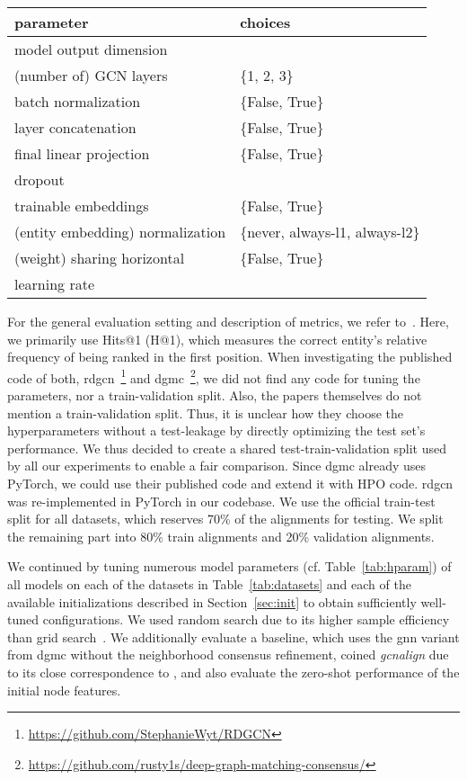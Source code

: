\documentclass[runningheads]{llncs}
\begin{document}
\begin{table}[t]
\begin{tabular*}{\textwidth}{lp{}}
    parameter & choices \\
    \midrule
    model output dimension &  \\
    (number of) GCN layers & \{1, 2, 3\} \\
    batch normalization & \{False, True\} \\
    layer concatenation & \{False, True\} \\
    final linear projection & \{False, True\} \\
    dropout &  \\
    trainable embeddings &  \{False, True\} \\
    (entity embedding) normalization & \{never, always-l1, always-l2\} \\
    (weight) sharing horizontal & \{False, True\} \\
    learning rate &  \\
    \midrule
    \bottomrule
\end{tabular*} \end{table}
For the general evaluation setting and description of metrics, we refer to~\cite{DBLP:journals/corr/abs-2002-06914}.
Here, we primarily use Hits@1 (H@1), which measures the correct entity's relative frequency of being ranked in the first position.
When investigating the published code of both, \acrshort{rdgcn}~\cite{DBLP:conf/ijcai/WuLF0Y019}\footnote{\url{https://github.com/StephanieWyt/RDGCN}} and \acrshort{dgmc}~\cite{DBLP:conf/iclr/FeyL0MK20}\footnote{\url{https://github.com/rusty1s/deep-graph-matching-consensus/}}, we did not find any code for tuning the parameters, nor a train-validation split.
Also, the papers themselves do not mention a train-validation split.
Thus, it is unclear how they choose the hyperparameters without a test-leakage by directly optimizing the test set's performance.
We thus decided to create a shared test-train-validation split used by all our experiments to enable a fair comparison.
Since \acrshort{dgmc} already uses PyTorch, we could use their published code and extend it with HPO code.
\acrshort{rdgcn} was re-implemented in PyTorch in our codebase.
We use the official train-test split for all datasets, which reserves 70\% of the alignments for testing.
We split the remaining part into 80\% train alignments and 20\% validation alignments.

We continued by tuning numerous model parameters (cf. Table~\ref{tab:hparam}) of all models on each of the datasets in Table~\ref{tab:datasets} and each of the available initializations described in Section~\ref{sec:init} to obtain sufficiently well-tuned configurations.
We used random search due to its higher sample efficiency than grid search~\cite{DBLP:journals/jmlr/BergstraB12}.
We additionally evaluate a baseline, which uses the \gls{gnn} variant from \acrshort{dgmc} without the neighborhood consensus refinement, coined \emph{\acrshort{gcnalign}} due to its close correspondence to \cite{DBLP:conf/emnlp/WangLLZ18}, and also evaluate the zero-shot performance of the initial node features.
\end{document}
